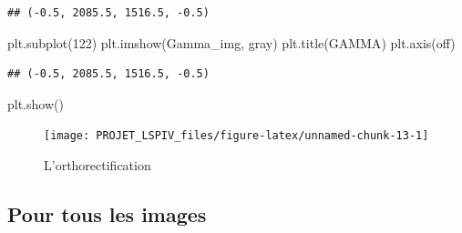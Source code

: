 \documentclass[
]{article}
\newenvironment{Shaded}{\begin{snugshade}}{\end{snugshade}}
\newcommand{\DecValTok}[1]{\textcolor[rgb]{0.00,0.00,0.81}{#1}}
\newcommand{\NormalTok}[1]{#1}
\newcommand{\StringTok}[1]{\textcolor[rgb]{0.31,0.60,0.02}{#1}}
\begin{document}
\begin{verbatim}
## (-0.5, 2085.5, 1516.5, -0.5)
\end{verbatim}

\begin{Shaded}
\begin{Highlighting}[]
\NormalTok{plt.subplot(}\DecValTok{122}\NormalTok{)}
\NormalTok{plt.imshow(Gamma\_img, }\StringTok{\textquotesingle{}gray\textquotesingle{}}\NormalTok{)}
\NormalTok{plt.title(}\StringTok{\textquotesingle{}GAMMA\textquotesingle{}}\NormalTok{)}
\NormalTok{plt.axis(}\StringTok{\textquotesingle{}off\textquotesingle{}}\NormalTok{) }
\end{Highlighting}
\end{Shaded}

\begin{verbatim}
## (-0.5, 2085.5, 1516.5, -0.5)
\end{verbatim}

\begin{Shaded}
\begin{Highlighting}[]
\NormalTok{plt.show()}
\end{Highlighting}
\end{Shaded}

\begin{figure}[H]
\texttt{[image: PROJET\_LSPIV\_files/figure-latex/unnamed-chunk-13-1]} \caption{L'orthorectification}\label{fig:unnamed-chunk-13}
\end{figure}

\hypertarget{pour-tous-les-images}{%
\subsection*{Pour tous les images}\label{pour-tous-les-images}}
\end{document}
